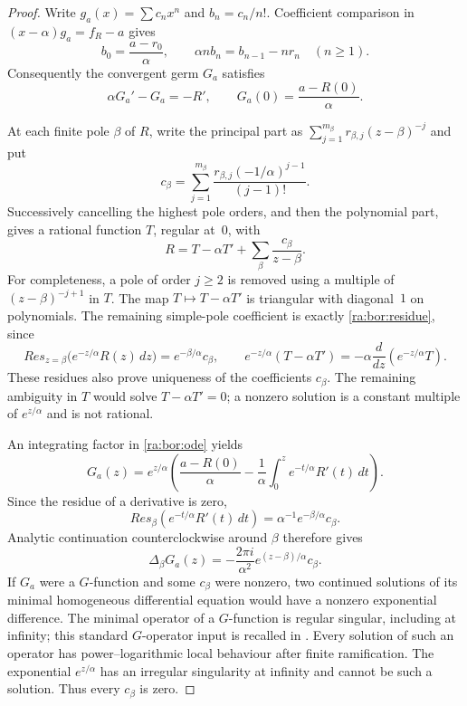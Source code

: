 \documentclass[11pt,a4paper]{article}
\theoremstyle{definition}
\theoremstyle{remark}
\theoremstyle{plain}
\numberwithin{equation}{section}
\def\operatorname#1{#1}\def\mathrm#1{#1}}
\begin{document}
\begin{proof}
Write $g_a(x)=\sum c_nx^n$ and $b_n=c_n/n!$.  Coefficient comparison
in $(x-\alpha)g_a=f_R-a$ gives
\[
 b_0=\frac{a-r_0}{\alpha},\qquad
 \alpha n b_n=b_{n-1}-nr_n\quad(n\ge1).
\]
Consequently the convergent germ $G_a$ satisfies
\begin{equation}\label{ra:bor:ode}
 \alpha G_a'-G_a=-R',\qquad
 G_a(0)=\frac{a-R(0)}{\alpha}.
\end{equation}

At each finite pole $\beta$ of $R$, write the principal part as
$\sum_{j=1}^{m_\beta}r_{\beta,j}(z-\beta)^{-j}$ and put
\begin{equation}\label{ra:bor:residue}
 c_\beta=
 \sum_{j=1}^{m_\beta}
 \frac{r_{\beta,j}(-1/\alpha)^{j-1}}{(j-1)!}.
\end{equation}
Successively cancelling the highest pole orders, and then the polynomial
part, gives a rational function $T$, regular at~$0$, with
\begin{equation}\label{ra:bor:reduction}
 R=T-\alpha T'+\sum_\beta\frac{c_\beta}{z-\beta}.
\end{equation}
For completeness, a pole of order $j\ge2$ is removed using a multiple
of $(z-\beta)^{-j+1}$ in $T$.  The map $T\mapsto T-\alpha T'$ is
triangular with diagonal~$1$ on polynomials.  The remaining simple-pole
coefficient is exactly \eqref{ra:bor:residue}, since
\[
 \operatorname{Res}_{z=\beta}\bigl(e^{-z/\alpha}R(z)\,dz\bigr)
   =e^{-\beta/\alpha}c_\beta,
 \qquad
 e^{-z/\alpha}(T-\alpha T')
   =-\alpha\frac{d}{dz}(e^{-z/\alpha}T).
\]
These residues also prove uniqueness of the coefficients $c_\beta$.
The remaining ambiguity in $T$ would solve $T-\alpha T'=0$; a nonzero
solution is a constant multiple of $e^{z/\alpha}$ and is not rational.

An integrating factor in \eqref{ra:bor:ode} yields
\[
 G_a(z)=e^{z/\alpha}\left(
 \frac{a-R(0)}{\alpha}
 -\frac1\alpha\int_0^z e^{-t/\alpha}R'(t)\,dt\right).
\]
Since the residue of a derivative is zero,
\[
 \operatorname{Res}_\beta(e^{-t/\alpha}R'(t)\,dt)
 =\alpha^{-1}e^{-\beta/\alpha}c_\beta.
\]
Analytic continuation counterclockwise around $\beta$ therefore gives
\begin{equation}\label{ra:bor:monodromy}
 \Delta_\beta G_a(z)
 =-\frac{2\pi i}{\alpha^2}e^{(z-\beta)/\alpha}c_\beta.
\end{equation}
If $G_a$ were a $G$-function and some $c_\beta$ were nonzero, two
continued solutions of its minimal homogeneous differential equation
would have a nonzero exponential difference.  The minimal operator of
a $G$-function is regular singular, including at infinity; this standard
$G$-operator input is recalled in \cite[\S1, p.~3]{FRoperators}.
Every solution of such an operator has power--logarithmic local behaviour
after finite ramification.  The exponential $e^{z/\alpha}$ has an
irregular singularity at infinity and cannot be such a solution.
Thus every $c_\beta$ is zero.


\end{proof}
\end{document}
